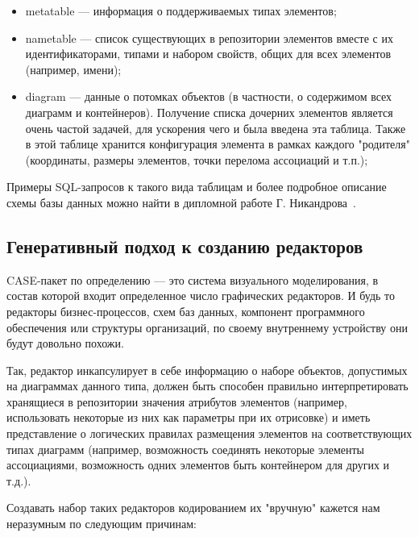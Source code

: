 \documentclass[a5paper]{article}
\begin{document}
\begin{itemize}
  \item metatable --- информация о поддерживаемых типах элементов;
  \item nametable --- список существующих в репозитории
        элементов вместе с их идентификаторами, типами и набором свойств, общих
        для всех элементов (например, имени);
  \item diagram --- данные о потомках объектов (в
        частности, о содержимом всех диаграмм и контейнеров). Получение списка
        дочерних элементов является очень частой задачей, для ускорения чего и
        была введена эта таблица. Также в этой таблице хранится конфигурация
        элемента в рамках каждого "родителя" (координаты, размеры элементов,
        точки перелома ассоциаций и т.п.);
\end{itemize}

Примеры SQL-запросов к такого вида таблицам
и более подробное описание схемы базы данных можно найти в дипломной
работе Г. Никандрова~\cite{nikandrov}.

\subsection{Генеративный подход к созданию редакторов}

CASE-пакет по определению --- это система
визуального моделирования, в состав которой входит определенное число
графических редакторов. И будь то редакторы бизнес-процессов, схем баз
данных, компонент программного обеспечения или структуры организаций,
по своему внутреннему устройству они будут довольно похожи.

Так, редактор инкапсулирует в себе информацию о наборе объектов, допустимых
на диаграммах данного типа, должен быть способен правильно
интерпретировать хранящиеся в репозитории значения атрибутов элементов
(например, использовать некоторые из них как параметры при их
отрисовке) и иметь представление о логических правилах размещения
элементов на соответствующих типах диаграмм (например, возможность
соединять некоторые элементы ассоциациями, возможность одних элементов
быть контейнером для других и т.д.).

Создавать набор таких редакторов кодированием их "вручную" кажется нам
неразумным по следующим причинам:
\end{document}
